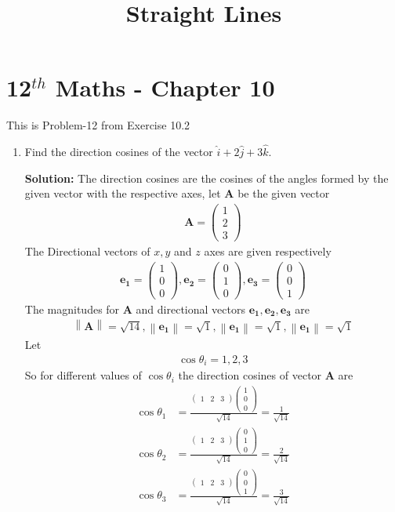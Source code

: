 \documentclass[12pt]{article}
\providecommand{\norm}[1]{\left\lVert#1\right\rVert}
\newcommand{\solution}{\noindent \textbf{Solution: }}
\newcommand{\myvec}[1]{\ensuremath{\begin{pmatrix}#1\end{pmatrix}}}
\let\vec\mathbf
\begin{document}
\begin{center}
\enlargethispage{-4cm}
\title{\textbf{Straight Lines}}
\date{\vspace{-5ex}} %
\maketitle
\end{center}
\setcounter{page}{1}
\section*{12$^{th}$ Maths - Chapter 10}
This is Problem-12 from Exercise 10.2
\begin{enumerate}
\item Find the direction cosines of the vector $\hat{i} +2\hat{j}+3\hat{k}$.

\solution The direction cosines are the cosines of the angles formed by the given vector with the respective axes, let $\vec{A}$ be the given vector
\begin{align}
	\vec{A} =\myvec{1\\2\\3}
\end{align}
The Directional vectors of $x,y$ and $z$ axes are given respectively 
\begin{align}
		\vec{e_1} =\myvec{1\\0\\0},\vec{e_2}=\myvec{0\\1\\0},\vec{e_3} =\myvec{0\\0\\1}
\end{align}
		The magnitudes for $\vec{A}$ and directional vectors $\vec{e_1},\vec{e_2},\vec{e_3}$ are
	\begin{align}
\norm{\vec{A}} =\sqrt{14},\norm{\vec{e_1}}=\sqrt{1},\norm{\vec{e_1}}=\sqrt{1},\norm{\vec{e_1}}=\sqrt{1}
	\end{align}
Let 
\begin{align}
	\cos\theta_i=1,2,3  
\end{align}
		So for different values of $\cos\theta_i$ the direction cosines of vector $\vec{A}$ are
\begin{align}
	\cos\theta_1 &=\frac{\myvec{1&2&3}\myvec{1\\0\\0}}{\sqrt{14}}=\frac{1}{\sqrt{14}}\\
	\cos\theta_2 &=\frac{\myvec{1&2&3}\myvec{0\\1\\0}}{\sqrt{14}}=\frac{2}{\sqrt{14}}\\
	\cos\theta_3 &=\frac{\myvec{1&2&3}\myvec{0\\0\\1}}{\sqrt{14}}=\frac{3}{\sqrt{14}}
\end{align}
\end{enumerate}
\end{document}
